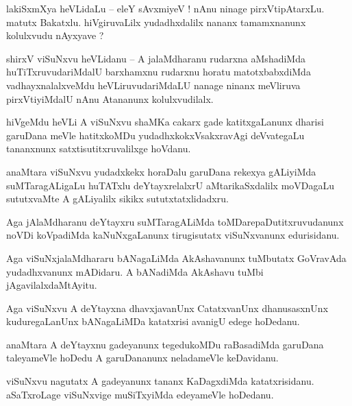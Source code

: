 \documentclass{article}
\begin{document}
\begin{mn}%
lakiSxmXya heVLidaLu -- eleY sAvxmiyeV ! nAnu ninage pirxVtipAtarxLu. matutx Bakatxlu. 
hiVgiruvaLilx yudadhxdalilx nananx tamamxnanunx kolulxvudu nAyxyave ?
\end{mn}

\begin{mn}%
shirxV viSuNxvu heVLidanu -- A jalaMdharanu rudarxna aMshadiMda huTiTxruvudariMdalU barxhamxnu 
rudarxnu horatu matotxbabxdiMda vadhayxnalalxveMdu heVLiruvudariMdaLU nanage ninanx meVliruva 
pirxVtiyiMdalU nAnu Atananunx kolulxvudilalx.
\end{mn}

\begin{mn}%
hiVgeMdu heVLi A viSuNxvu shaMKa cakarx gade katitxgaLanunx dharisi garuDana meVle hatitxkoMDu 
yudadhxkokxVsakxravAgi deVvategaLu tananxnunx satxtisutitxruvalilxge hoVdanu.
\end{mn}

\begin{mn}%
anaMtara viSuNxvu yudadxkekx horaDalu garuDana rekexya gALiyiMda suMTaragALigaLu huTATxlu 
deYtayxrelalxrU aMtarikaSxdalilx moVDagaLu sututxvaMte A gALiyalilx sikikx sututxtatxlidadxru.
\end{mn}

\begin{mn}%
Aga jAlaMdharanu deYtayxru suMTaragALiMda toMDarepaDutitxruvudanunx noVDi koVpadiMda kaNuNxgaLanunx 
tirugisutatx viSuNxvanunx edurisidanu.
\end{mn}

\begin{mn}%
Aga viSuNxjalaMdhararu bANagaLiMda AkAshavanunx tuMbutatx GoVravAda yudadhxvanunx mADidaru. A 
bANadiMda AkAshavu tuMbi jAgavilalxdaMtAyitu.
\end{mn}

\begin{mn}%
Aga viSuNxvu A deYtayxna dhavxjavanUnx CatatxvanUnx dhanusasxnUnx kuduregaLanUnx bANagaLiMDa 
katatxrisi avanigU edege hoDedanu.
\end{mn}

\begin{mn}%
anaMtara A deYtayxnu gadeyanunx tegedukoMDu raBasadiMda garuDana taleyameVle hoDedu A garuDananunx 
neladameVle keDavidanu.
\end{mn}

\begin{mn}%
viSuNxvu nagutatx A gadeyanunx tananx KaDagxdiMda katatxrisidanu. aSaTxroLage viSuNxvige 
muSiTxyiMda edeyameVle hoDedanu.
\end{mn}
\end{document}
